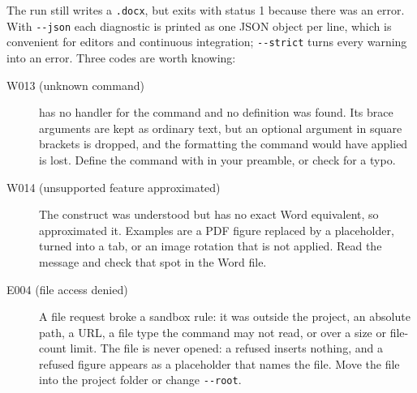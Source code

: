 The run still writes a \texttt{.docx}, but exits with status 1 because there
was an error. With \verb|--json| each diagnostic is printed as one JSON
object per line, which is convenient for editors and continuous integration;
\verb|--strict| turns every warning into an error. Three codes are worth
knowing:

\begin{description}
  \item[W013 (unknown command)] \texdocx{} has no handler for the command and
    no definition was found. Its brace arguments are kept as ordinary text,
    but an optional argument in square brackets is dropped, and the
    formatting the command would have applied is lost. Define the command with  in your preamble, or check
    for a typo.
  \item[W014 (unsupported feature approximated)] The construct was understood
    but has no exact Word equivalent, so \texdocx{} approximated it. Examples
    are a PDF figure replaced by a placeholder,  turned into a tab,
    or an image rotation that is not applied. Read the message and check that
    spot in the Word file.
  \item[E004 (file access denied)] A file request broke a sandbox rule: it
    was outside the project, an absolute path, a URL, a file type the
    command may not read, or over a size or file-count limit. The file is never opened: a refused  inserts nothing, and a
    refused figure appears as a placeholder that names the file.
    Move the file into the project folder or change \verb|--root|.
\end{description}
